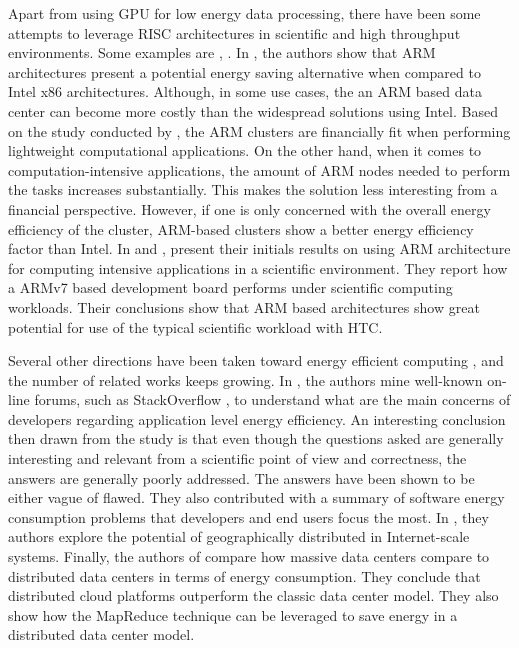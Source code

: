 Apart from using GPU for low energy data processing, there have been some attempts to leverage RISC architectures in scientific and high throughput environments. Some examples are \cite{AALTO_ARM} \cite{ACAT13ARM},
\cite{ACAT14ARMDAVID}. In \cite{AALTO_ARM}, the authors show that ARM architectures present a potential energy saving alternative when compared to Intel x86 architectures. Although, in some use cases, the an ARM based data center can become more costly than the widespread solutions using Intel. Based on the study conducted by \cite{AALTO_ARM}, the ARM clusters are financially fit when performing lightweight computational applications. On the other hand, when it comes to computation-intensive applications, the amount of ARM nodes needed to perform the tasks increases substantially. This makes the solution less interesting from a financial perspective. However, if one is only concerned with the overall energy efficiency of the cluster, ARM-based clusters show a better energy efficiency factor than Intel. In \cite{ACAT13ARM} and \cite{ACAT14ARMDAVID}, present their initials results on using ARM architecture for computing intensive applications in a scientific environment. They report how a ARMv7 based development board performs under scientific computing workloads. Their conclusions show that ARM based architectures show great potential for use of the typical scientific workload with HTC.

Several other directions have been taken toward energy efficient computing \cite{QUESTIONS_ENERGY} \cite{GREENING},
\cite{ENERGY_DILEMMA} and the number of related works keeps growing. In \cite{QUESTIONS_ENERGY}, the authors mine well-known on-line forums, such as StackOverflow \cite{STACKOVERFLOW}, to understand what are the main concerns of developers regarding application level energy efficiency. An interesting conclusion then drawn from the study is that even though the questions asked are generally interesting and relevant from a scientific point of view and correctness, the answers are generally poorly addressed. The answers have been shown to be either vague of flawed. They also contributed with a summary of software energy consumption problems that developers and end users focus the most. In \cite{GREENING}, they authors explore the potential of geographically distributed in Internet-scale systems. Finally, the authors of \cite{ENERGY_DILEMMA} compare how massive data centers compare to distributed data centers in terms of energy consumption. They conclude that distributed cloud platforms outperform the classic data center model. They also show how the MapReduce technique can be leveraged to save energy in a distributed data center model. 

